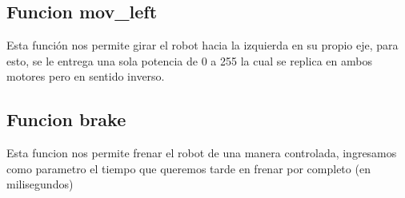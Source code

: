 \documentclass[12pt]{article}
\begin{document}
\subsection*{Funcion mov\_left}
Esta función nos permite girar el robot hacia la izquierda en su propio eje, para esto, se le entrega una sola potencia de 0 a 255 la cual se replica en ambos motores pero en sentido inverso.

\subsection*{Funcion brake}
Esta funcion nos permite frenar el robot de una manera controlada, ingresamos como parametro el tiempo que queremos tarde en frenar por completo (en milisegundos)
\end{document}
